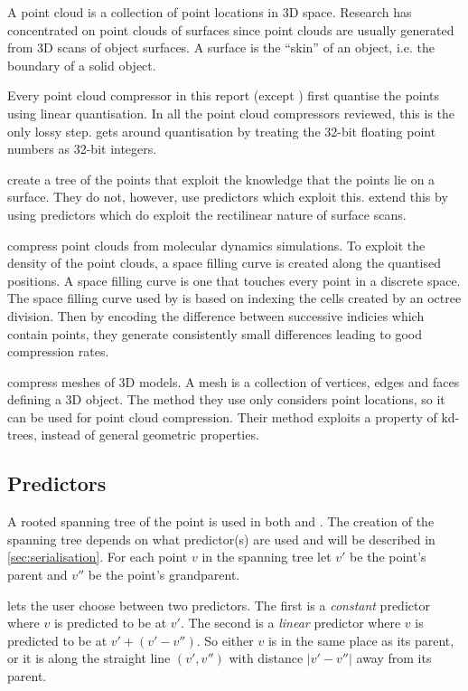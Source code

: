 \documentclass[a4paper]{report}
\begin{document}
A point cloud is a collection of point locations in 3D space. Research has
concentrated on point clouds of surfaces since point clouds are usually
generated from 3D scans of object surfaces. A surface is the ``skin'' of an
object, i.e. the boundary of a solid object.

Every point cloud compressor in this report (except \citet{chen2005lcp}) first
quantise the points using linear quantisation. In all the point cloud
compressors reviewed, this is the only lossy step. \citet{chen2005lcp} gets
around quantisation by treating the 32-bit floating point numbers as 32-bit
integers.

\citet{gumholdcomp} create a tree of the points that exploit the knowledge that
the points lie on a surface. They do not, however, use predictors which
exploit this. \citet{merrycomp} extend this by using predictors which do
exploit the rectilinear nature of surface scans.

\citet{omeltchenko2000sls} compress point clouds from molecular dynamics
simulations. To exploit the density of the point clouds, a space filling curve
is created along the quantised positions. A space filling curve is one that
touches every point in a discrete space. The space filling curve used by
\citet{omeltchenko2000sls} is based on indexing the cells created by an octree
division. Then by encoding the difference between successive indicies which
contain points, they generate consistently small differences leading to good
compression rates.

\citet{devillers2000gci} compress meshes of 3D models. A mesh is a collection
of vertices, edges and faces defining a 3D object. The method they use only
considers point locations, so it can be used for point cloud
compression. Their method exploits a property of kd-trees, instead of general
geometric properties.


\subsection{Predictors}

A rooted spanning tree of the point is used in both \citet{gumholdcomp} and
\citet{merrycomp}. The creation of the spanning tree depends on what
predictor(s) are used and will be described in \ref{sec:serialisation}. For
each point $v$ in the spanning tree let $v'$ be the point's parent and $v''$
be the point's grandparent.

\citet{gumholdcomp} lets the user choose between two predictors. The first is
a \emph{constant} predictor where $v$ is predicted to be at $v'$. The second
is a \emph{linear} predictor where $v$ is predicted to be at $v' + (v' -
v'')$. So either $v$ is in the same place as its parent, or it is along the
straight line $(v', v'')$ with distance $|v'-v''|$ away from its parent.
\end{document}
